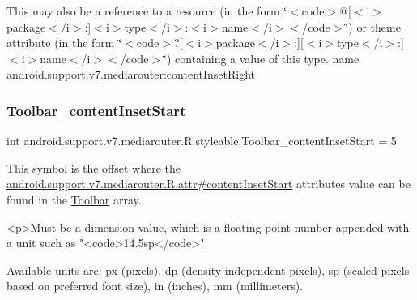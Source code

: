 This may also be a reference to a resource (in the form \char`\"{}$<$code$>$@\mbox{[}$<$i$>$package$<$/i$>$\+:\mbox{]}$<$i$>$type$<$/i$>$\+:$<$i$>$name$<$/i$>$$<$/code$>$\char`\"{}) or theme attribute (in the form \char`\"{}$<$code$>$?\mbox{[}$<$i$>$package$<$/i$>$\+:\mbox{]}\mbox{[}$<$i$>$type$<$/i$>$\+:\mbox{]}$<$i$>$name$<$/i$>$$<$/code$>$\char`\"{}) containing a value of this type.  name android.\+support.\+v7.\+mediarouter\+:content\+Inset\+Right \mbox{\label{classandroid_1_1support_1_1v7_1_1mediarouter_1_1R_1_1styleable_a46fac76c3774e9ae389554b7c4485493}} 
\subsubsection{\texorpdfstring{Toolbar\+\_\+content\+Inset\+Start}{Toolbar\_contentInsetStart}}
{\footnotesize\ttfamily int android.\+support.\+v7.\+mediarouter.\+R.\+styleable.\+Toolbar\+\_\+content\+Inset\+Start = 5\hspace{0.3cm}{\ttfamily [static]}}

This symbol is the offset where the \hyperlink{classandroid_1_1support_1_1v7_1_1mediarouter_1_1R_1_1attr_a26b877aa26d7c68054fe041baffc1882}{android.\+support.\+v7.\+mediarouter.\+R.\+attr\#content\+Inset\+Start} attribute\textquotesingle{}s value can be found in the \hyperlink{classandroid_1_1support_1_1v7_1_1mediarouter_1_1R_1_1styleable_a6815cdfaadde30c82b955863af196899}{Toolbar} array.

\begin{DoxyVerb}      <p>Must be a dimension value, which is a floating point number appended with a unit such as "<code>14.5sp</code>".
\end{DoxyVerb}
 Available units are\+: px (pixels), dp (density-\/independent pixels), sp (scaled pixels based on preferred font size), in (inches), mm (millimeters). 

